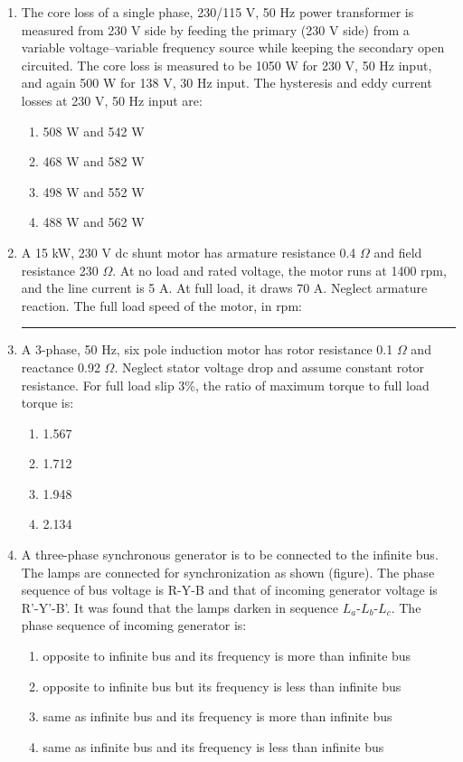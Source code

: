 \documentclass[journal,12pt,onecolumn]{IEEEtran}
\begin{document}
\begin{enumerate}[label=Q\arabic*:, leftmargin=*, itemindent=0pt, start=36]

\item The core loss of a single phase, 230/115 V, 50 Hz power transformer is measured from 230 V side by feeding the primary (230 V side) from a variable voltage–variable frequency source while keeping the secondary open circuited. The core loss is measured to be 1050 W for 230 V, 50 Hz input, and again 500 W for 138 V, 30 Hz input. The hysteresis and eddy current losses at 230 V, 50 Hz input are:
\begin{enumerate}[label=(\Alph*)]
    \item 508 W and 542 W
    \item 468 W and 582 W
    \item 498 W and 552 W
    \item 488 W and 562 W
\end{enumerate}

\item A 15 kW, 230 V dc shunt motor has armature resistance 0.4 $\Omega$ and field resistance 230 $\Omega$. At no load and rated voltage, the motor runs at 1400 rpm, and the line current is 5 A. At full load, it draws 70 A. Neglect armature reaction. The full load speed of the motor, in rpm: \rule{3cm}{0.15mm}

\item A 3-phase, 50 Hz, six pole induction motor has rotor resistance 0.1 $\Omega$ and reactance 0.92 $\Omega$. Neglect stator voltage drop and assume constant rotor resistance. For full load slip 3\%, the ratio of maximum torque to full load torque is:
\begin{enumerate}[label=(\Alph*)]
    \item 1.567
    \item 1.712
    \item 1.948
    \item 2.134
\end{enumerate}

\item A three-phase synchronous generator is to be connected to the infinite bus. The lamps are connected for synchronization as shown (figure). The phase sequence of bus voltage is R-Y-B and that of incoming generator voltage is R'-Y'-B'. It was found that the lamps darken in sequence $L_a$-$L_b$-$L_c$. The phase sequence of incoming generator is:
\begin{enumerate}[label=(\Alph*)]
    \item opposite to infinite bus and its frequency is more than infinite bus
    \item opposite to infinite bus but its frequency is less than infinite bus
    \item same as infinite bus and its frequency is more than infinite bus
    \item same as infinite bus and its frequency is less than infinite bus
\end{enumerate}

\end{enumerate}
\end{document}
